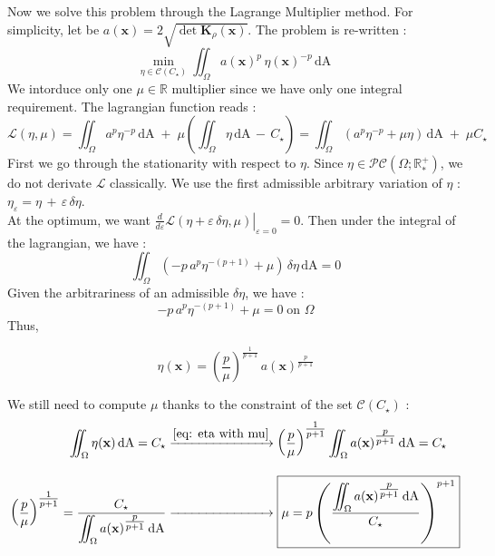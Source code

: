 \documentclass[11pt,a4paper]{article}
\begin{document}
\noindent
Now we solve this problem through the Lagrange Multiplier method. For simplicity, let be  $a(\mathbf{x})=2\sqrt{\det{\mathbf{K}_\rho}(\mathbf{x})}$. The problem is re-written : 
\begin{equation}
    \min_{\eta \in \mathscr{C}(C_\star)} \iint_\Omega a(\mathbf{x})^p\,\eta(\mathbf{x})^{-p} \,\mathrm{dA}\;
\end{equation}
\noindent We intorduce only one $\mu\in\mathbb{R}$ multiplier since we have only one integral requirement. The lagrangian function reads :
\begin{equation}
    \mathcal{L}(\eta,\mu)=\iint_\Omega a^p\eta^{-p}\,\mathrm{dA}\;+\; \mu\left(\iint_\Omega\eta\,\mathrm{dA}\,-\,C_\star\right) = \iint_\Omega \left(a^p\eta^{-p}+\mu\eta\right)\,\mathrm{dA}\;+\; \mu C_\star
\end{equation}
\noindent First we go through the stationarity with respect to $\eta$. Since $\eta\in\mathcal{PC}(\Omega;\mathbb R_*^+)$, we do not derivate $\mathcal{L}$ classically. We use the first admissible arbitrary variation of $\eta$ : $\eta_\varepsilon=\eta\,+\,\varepsilon\,\delta\eta$. \\
\noindent At the optimum, we want $\left.
\frac{d}{d\varepsilon}
\mathcal{L}\left(\eta+\varepsilon\,\delta\eta,\mu\right)
\right|_{\varepsilon=0}=0$. Then under the integral of the lagrangian, we have : 
\begin{equation*}
    \iint_\Omega\left(-p\,a^p\eta^{-(p+1)} + \mu\right)\,\delta\eta \, \mathrm{dA} =0
\end{equation*}
\noindent Given the arbitrariness of an admissible $\delta\eta$, we have :
\begin{equation}
    -p\,a^p\eta^{-(p+1)} + \mu = 0 \;\text{on } \Omega
\end{equation}
\noindent Thus,

\begin{equation}
    \label{eq: eta with mu}
    \boxed{
    \eta(\mathbf{x})=\left(\frac{p}{\mu}\right)^{\tfrac{1}{p+1}}\,a(\mathbf{x})^{\tfrac{p}{p+1}}
    }
\end{equation}

\noindent We still need to compute $\mu$ thanks to the constraint of the set  $\mathscr{C}(C_\star)$ :
\begin{align}
    \iint_\Omega\eta(\mathbf{x})\,\mathrm{dA} = C_\star &\xrightarrow[]{\eqref{eq: eta with mu}} \left(\frac{p}{\mu}\right)^{\tfrac{1}{p+1}} \iint_\Omega a(\mathbf{x})^{\tfrac{p}{p+1}} \,\mathrm{dA} = C_\star \nonumber \\[1em]
    \label{eq: mu expression}
    \left(\frac{p}{\mu}\right)^{\tfrac{1}{p+1}} = \dfrac{C_\star}{\displaystyle\iint_\Omega a(\mathbf{x})^{\tfrac{p}{p+1}} \,\mathrm{dA}}  &\xrightarrow[]{\phantom{\eqref{eq: eta with mu}}} \boxed{\mu = p \left(\dfrac{\displaystyle\iint_\Omega a(\mathbf{x})^{\tfrac{p}{p+1}}\, \mathrm{dA}}{C_\star}\right)^{p+1}}
\end{align}
\end{document}
